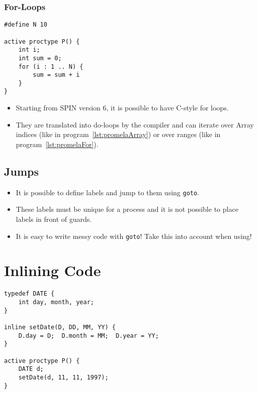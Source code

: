\documentclass[a4paper, 11pt, accentcolor = tud3b]{tudreport}
\newcommand{\inlinePromela}[1]{\lstinline[language = PROMELA]|#1|}
\begin{document}
				\subsubsection{For-Loops}
					\begin{lstlisting}[caption = { PROMELA For-Loops }, label = lst:promelaFor, language = PROMELA]
#define N 10

active proctype P() {
	int i;
	int sum = 0;
	for (i : 1 .. N) {
		sum = sum + i
	}
}
					\end{lstlisting}
				
					\begin{itemize}
						\item Starting from SPIN version 6, it is possible to have C-style for loops.
						\item They are translated into do-loops by the compiler and can iterate over Array indices (like in program~\ref{lst:promelaArray}) or over ranges (like in program~\ref{lst:promelaFor}).
					\end{itemize}

			\subsection{Jumps}
				
			
				\begin{itemize}
					\item It is possible to define labels and jump to them using \inlinePromela{goto}.
					\item These labels must be unique for a process and it is not possible to place labels in front of guards.
					\item It is easy to write messy code with \inlinePromela{goto}! Take this into account when using!
				\end{itemize}

		\section{Inlining Code}
			\begin{lstlisting}[caption = { PROMELA Inlines }, label = lst:promelaInline, language = PROMELA]
typedef DATE {
	int day, month, year;
}

inline setDate(D, DD, MM, YY) {
	D.day = D;  D.month = MM;  D.year = YY;
}

active proctype P() {
	DATE d;
	setDate(d, 11, 11, 1997);
}
			\end{lstlisting}
\end{document}
